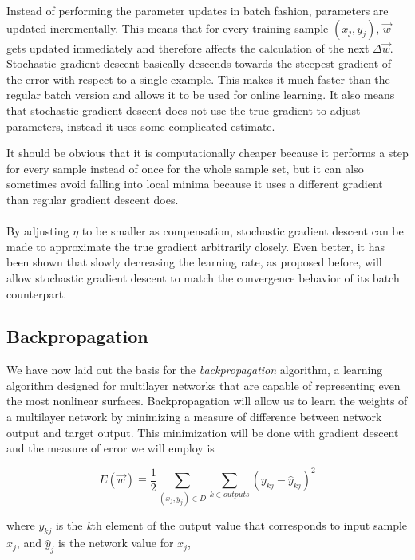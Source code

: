 Instead of performing the parameter updates in batch fashion,
parameters are updated incrementally.
This means that for every training sample $(x_j, y_j)$,
$\overrightarrow{w}$
gets updated immediately
and therefore affects the calculation of the next
$\Delta \overrightarrow{w}$.
Stochastic gradient descent basically descends towards the steepest
gradient of the error with respect to a single example.
This makes it much faster than the regular batch version
and allows it to be used for online learning.
It also means that stochastic gradient descent
does not use the true gradient to adjust parameters,
instead it uses some complicated estimate.

It should be obvious that it is computationally cheaper
because it performs a step for every sample
instead of once for the whole sample set,
but it can also sometimes avoid falling into local minima
because it uses a different gradient than regular gradient descent does.

\paragraph{}
By adjusting $\eta$ to be smaller as compensation,
stochastic gradient descent can be made to approximate
the true gradient arbitrarily closely.
Even better, it has been shown that slowly decreasing
the learning rate, as proposed before,
will allow stochastic gradient descent
to match the convergence behavior
of its batch counterpart.

\subsection{Backpropagation}
We have now laid out the basis for the \textit{backpropagation} algorithm,
a learning algorithm designed for multilayer networks
that are capable of representing even the most nonlinear surfaces.
Backpropagation \parencite{rumelhart1988learning}
will allow us to learn the weights of a multilayer network
by minimizing a measure of difference between network output and target output.
This minimization will be done with gradient descent
and the measure of error we will employ is

\begin{equation}
  E(\overrightarrow{w}) \equiv \frac{1}{2} \sum_{(x_j, y_j) \in D}
  \sum_{k \in outputs}(y_{kj} - \hat{y}_{kj})^2
\end{equation}

where $y_{kj}$ is the \textit{k}th element of the output value
that corresponds to input sample $x_{j}$,
and $\hat{y}_{j}$ is the network value for $x_{j}$,

